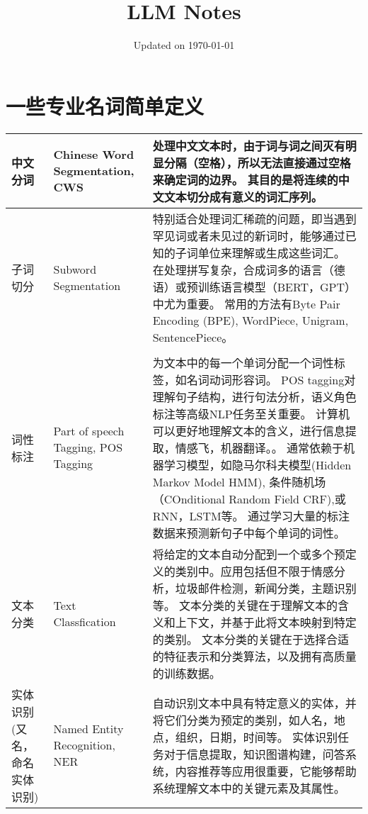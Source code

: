 \documentclass{article}
\title{LLM Notes}
\author{\mathfrak{Y} \mathfrak{R} }
\date{Updated on \today}
\begin{document}
\maketitle

\section{一些专业名词简单定义}


    
\begin{longtable}{p{3cm}p{5cm}p{9cm}}\toprule
\hline
\hline
中文分词 & Chinese Word Segmentation, CWS & 处理中文文本时，由于词与词之间灭有明显分隔（空格），所以无法直接通过空格来确定词的边界。
                                            其目的是将连续的中文文本切分成有意义的词汇序列。 \\
\hline
子词切分 & Subword Segmentation           &   特别适合处理词汇稀疏的问题，即当遇到罕见词或者未见过的新词时，能够通过已知的子词单位来理解或生成这些词汇。
                                            在处理拼写复杂，合成词多的语言（德语）或预训练语言模型（BERT，GPT）中尤为重要。
                                            常用的方法有Byte Pair Encoding (BPE), WordPiece, Unigram, SentencePiece。\\                                                                 \\
\hline
词性标注 & Part of speech Tagging, POS Tagging & 为文本中的每一个单词分配一个词性标签，如名词动词形容词。 
                                                POS tagging对理解句子结构，进行句法分析，语义角色标注等高级NLP任务至关重要。
                                                计算机可以更好地理解文本的含义，进行信息提取，情感飞，机器翻译。。
                                                通常依赖于机器学习模型，如隐马尔科夫模型(Hidden Markov Model HMM), 条件随机场（COnditional Random Field CRF),或RNN，LSTM等。
                                                通过学习大量的标注数据来预测新句子中每个单词的词性。\\
\hline
文本分类 & Text Classfication & 将给定的文本自动分配到一个或多个预定义的类别中。应用包括但不限于情感分析，垃圾邮件检测，新闻分类，主题识别等。
                                文本分类的关键在于理解文本的含义和上下文，并基于此将文本映射到特定的类别。
                                文本分类的关键在于选择合适的特征表示和分类算法，以及拥有高质量的训练数据。\\
\hline
 实体识别 (又名，命名实体识别) & Named Entity Recognition, NER & 自动识别文本中具有特定意义的实体，并将它们分类为预定的类别，如人名，地点，组织，日期，时间等。
                                            实体识别任务对于信息提取，知识图谱构建，问答系统，内容推荐等应用很重要，它能够帮助系统理解文本中的关键元素及其属性。\\


\end{longtable}
\end{document}
